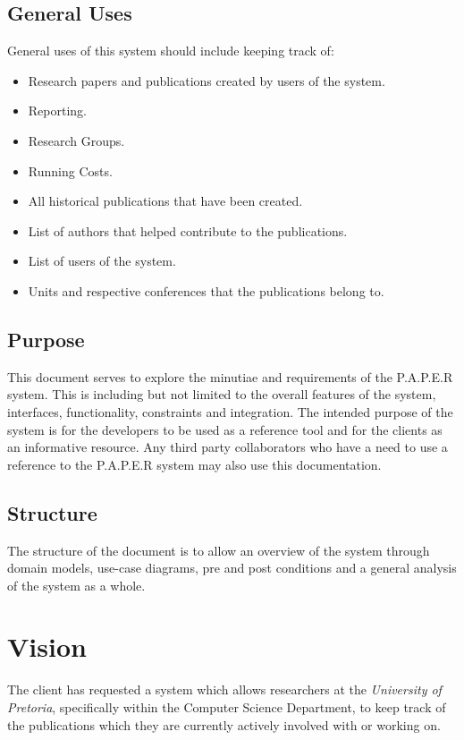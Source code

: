 \documentclass{article}
\begin{document}
	\subsection{General Uses}\label{subsec:generaluses}
		General uses of this system should include keeping track of:
            \begin{itemize}  
            
                \item Research papers and publications created by users of the system.
                \item Reporting.
                \item Research Groups.
                \item Running Costs.
                \item All historical publications that have been created.
                \item List of authors that helped contribute to the publications.
                \item List of users of the system.
                \item Units and respective conferences that the publications belong to.
            \end{itemize}
		\subsection{Purpose}\label{subsec:purpose}
			This document serves to explore the minutiae and requirements of the P.A.P.E.R system. This is including but not limited to the overall features of the system, interfaces, functionality, constraints and integration. The intended purpose of the system is for the developers to be used as a reference tool and for the clients as an informative resource. Any third party collaborators who have a need to use a reference to the P.A.P.E.R system may also use this documentation.
		\subsection{Structure}\label{subsec:structure}
			The structure of the document is to allow an overview of the system through domain models, use-case diagrams, pre and post conditions and a general analysis of the system as a whole.
		
		
	\cleardoublepage	
	\section{Vision}\label{sec:vision}
		The client has requested a system which allows researchers at the \textit{University of Pretoria}, specifically within the Computer Science Department, to keep track of the publications which they are currently actively involved with or working on.
		
\end{document}
